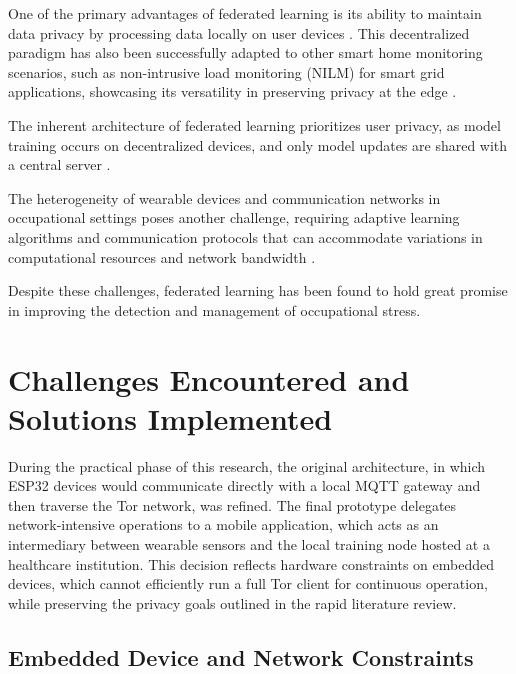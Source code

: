 \documentclass[12pt]{article}
\begin{document}
One of the primary advantages of federated learning is its ability to maintain data privacy by processing data locally on user devices \cite{jakub_kone_n__e9c179d4}. This decentralized paradigm has also been successfully adapted to other smart home monitoring scenarios, such as non-intrusive load monitoring (NILM) for smart grid applications, showcasing its versatility in preserving privacy at the edge \cite{shuang_dai_ae9ca8bc}. 

The inherent architecture of federated learning prioritizes user privacy, as model training occurs on decentralized devices, and only model updates are shared with a central server \cite{tomer_gafni_ff1f0d6e}. 

The heterogeneity of wearable devices and communication networks in occupational settings poses another challenge, requiring adaptive learning algorithms and communication protocols that can accommodate variations in computational resources and network bandwidth \cite{po_chen_lin_822ae077}.   

Despite these challenges, federated learning has been found to hold great promise in improving the detection and management of occupational stress. 

\section{Challenges Encountered and Solutions Implemented}

During the practical phase of this research, the original architecture, in which ESP32 devices would communicate directly with a local MQTT gateway and then traverse the Tor network, was refined. The final prototype delegates network-intensive operations to a mobile application, which acts as an intermediary between wearable sensors and the local training node hosted at a healthcare institution. This decision reflects hardware constraints on embedded devices, which cannot efficiently run a full Tor client for continuous operation, while preserving the privacy goals outlined in the rapid literature review.

\subsection{Embedded Device and Network Constraints}
\end{document}
